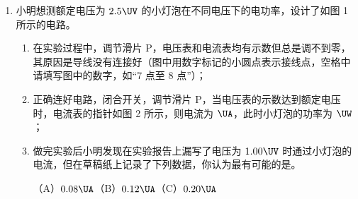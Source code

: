 \documentclass[\gkver]{gaokaozhenti}
\begin{document}
\begin{enumerate}
{（3）若小球在水平方向做匀速直线运动，则相邻的两张照片间的水平间距应相等，即 $x_{1}=x_{2}-x_{1}=x_{3}-x_{2}=x_{4}-x_{3}$；选用间距较远的两点间的水平位移 $x_{4}$ 进行水平初速度的计算 $v_{0}=\frac{x_{4}}{4T}$，误差会较小，故 D 正确。
}

\item
小明想测额定电压为 $2.5\UV$ 的小灯泡在不同电压下的电功率，设计了如图 1 所示的电路。
\begin{enumerate}
	\item
	在实验过程中，调节滑片 P，电压表和电流表均有示数但总是调不到零，其原因是导线没有连接好（图中用数字标记的小圆点表示接线点，空格中请填写图中的数字，如“7 点至 8 点”）；

	\item
	正确连好电路，闭合开关，调节滑片 P，当电压表的示数达到额定电压时，电流表的指针如图 2 所示，则电流为 $\UA$，此时小灯泡的功率为 $\UW$；

	\item
	做完实验后小明发现在实验报告上漏写了电压为 $1.00\UV$ 时通过小灯泡的电流，但在草稿纸上记录了下列数据，你认为最有可能的是。

	（A）$0.08\UA$\qquad （B）$0.12\UA$\qquad （C）$0.20\UA$
\end{enumerate}


\end{enumerate}
\end{document}
